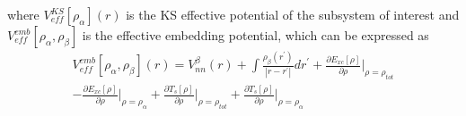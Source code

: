 \documentclass[a4paper,11pt]{report}
\begin{document}
where $V_{eff}^{KS}[\rho_{\alpha}](r)$ is the KS effective potential of the subsystem of interest and $V_{eff}^{emb}[\rho_{\alpha}, \rho_{\beta}]$ is 
the effective embedding potential, which can be expressed as 
\begin{equation}\label{ns4}
\begin{split}
V_{eff}^{emb}[\rho_{\alpha}, \rho_{\beta}](r) =  V_{nn}^{\beta}(r) + \int\frac{\rho_{\beta}(r^{'})}{|r-r^{'}|}dr^{'} + \frac{\partial E_{xc}[\rho]}{\partial\rho}\bigg|_{\rho=\rho_{tot}}\\
-\frac{\partial E_{xc}[\rho]}{\partial\rho}\bigg|_{\rho=\rho_{\alpha}} + \frac{\partial T_{s}[\rho]}{\partial\rho}\bigg|_{\rho=\rho_{tot}} + \frac{\partial T_{s}[\rho]}{\partial\rho}\bigg|_{\rho=\rho_{\alpha}}
\end{split}
\end{equation}
\end{document}
